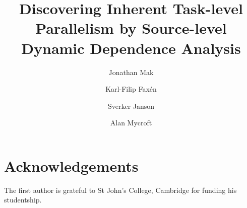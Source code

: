 \documentclass{llncs}
\begin{document}
\title{Discovering Inherent Task-level Parallelism by Source-level Dynamic Dependence Analysis}

\author{Jonathan Mak
   \and Karl-Filip Fax\'en
   \and Sverker Janson
   \and Alan Mycroft
}

          
\maketitle 





\section*{Acknowledgements}

The first author is grateful to St John's College, Cambridge for funding his studentship.


{}
\end{document}
